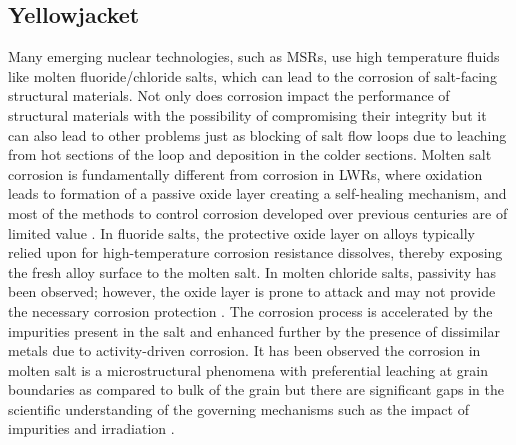 \subsection{Yellowjacket}
	Many emerging nuclear technologies, such as MSRs, use high temperature fluids like molten fluoride/chloride salts, which can lead to the corrosion of salt-facing structural materials. Not only does corrosion impact the performance of structural materials with the possibility of compromising their integrity but it can also lead to other problems just as blocking of salt flow loops due to leaching from hot sections of the loop and deposition in the colder sections. Molten salt corrosion is fundamentally different from corrosion in LWRs, where oxidation leads to formation of a passive oxide layer creating a self-healing mechanism, and most of the methods to control corrosion developed over previous centuries are of limited value \cite{Yoshioka:2017aa}. In fluoride salts, the protective oxide layer on alloys typically relied upon for high-temperature corrosion resistance dissolves, thereby exposing the fresh alloy surface to the molten salt. In molten chloride salts, passivity has been observed; however, the oxide layer is prone to attack and may not provide the necessary corrosion protection \cite{Sridharan:2013aa}. The corrosion process is accelerated by the impurities present in the salt and enhanced further by the presence of dissimilar metals due to activity-driven corrosion. It has been observed the corrosion in molten salt is a microstructural phenomena with preferential leaching at grain boundaries as compared to bulk of the grain but there are significant gaps in the scientific understanding of the governing mechanisms such as the impact of impurities and irradiation \cite{Zheng:2018aa,Zhou:2020aa,Zhu:2021aa,Raiman:2018aa,Pillai:2021aa,Guo:2018aa}.
	
